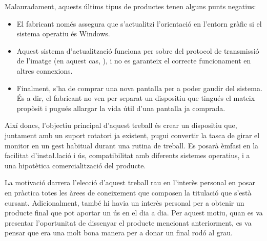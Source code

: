 Malauradament, aquests últims tipus de productes tenen alguns punts negatius:
\begin{itemize}
    \item El fabricant només assegura que s'actualitzi l'orientació en l'entorn
    gràfic si el sistema operatiu és Windows.
    \item Aquest sistema d'actualització funciona per sobre del protocol de
    transmissió de l'imatge (en aquest cas, ), i no es garanteix el correcte
    funcionament en altres connexions.
    \item Finalment, s'ha de comprar una nova pantalla per a poder gaudir del
    sistema. És a dir, el fabricant no ven per separat un dispositiu que tingués
    el mateix propòsit i pugués allargar la vida útil d'una pantalla ja
    comprada.
\end{itemize}

Així doncs, l'objectiu principal d'aquest treball és crear un dispositiu que,
juntament amb un suport rotatori ja existent, pugui convertir la tasca de girar
el monitor en un gest habitual durant una rutina de treball. Es posarà èmfasi en
la facilitat d'insta\l.lació i ús, compatibilitat amb diferents sistemes
operatius, i a una hipotètica comercialització del producte.

La motivació darrera l'elecció d'aquest treball rau en l'interès personal en
posar en pràctica totes les àrees de coneixement que composen la titulació que
s'està cursant. Adicionalment, també hi havia un interès personal per a obtenir
un producte final que pot aportar un ús en el dia a dia. Per aquest motiu, quan
es va presentar l'oportunitat de dissenyar el producte mencionat anteriorment,
es va pensar que era una molt bona manera per a donar un final rodó al grau.
